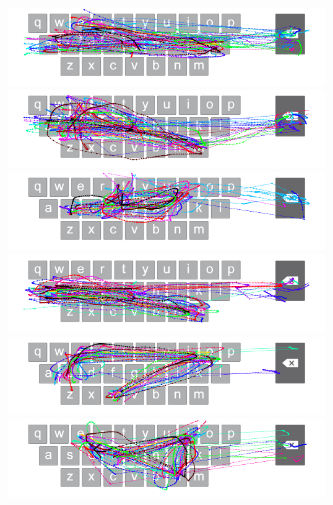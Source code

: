 \begin{figure}[t]
	\begin{minipage}[t]{8in}
	\hspace{-20pt}
	\begin{minipage}[t]{3.1in}
		\includegraphics[width=3.3in]{Figures/fig_gale_paths}
	\end{minipage}
	\begin{minipage}[t]{3in}
		\includegraphics[width=3.3in]{Figures/fig_games_paths}
	\end{minipage}
	\end{minipage}
	
	\begin{minipage}[t]{8in}
	\hspace{-20pt}
	\begin{minipage}[t]{3.1in}
		\includegraphics[width=3.3in]{Figures/fig_shift_paths}
	\end{minipage}
	\begin{minipage}[t]{3in}
		\includegraphics[width=3.3in]{Figures/fig_gamma_paths}
	\end{minipage}
	\end{minipage}
	
	\begin{minipage}[t]{8in}
	\hspace{-20pt}
	\begin{minipage}[t]{3.1in}
		\includegraphics[width=3.3in]{Figures/fig_cores_paths}
	\end{minipage}
	\begin{minipage}[t]{3in}
		\includegraphics[width=3.3in]{Figures/fig_finned_paths}
	\end{minipage}
	\end{minipage}
	

\end{figure}
